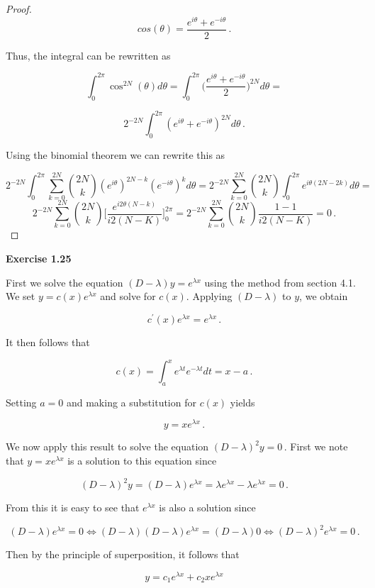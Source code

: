 \documentclass[a4paper]{article}
\numberwithin{equation}{section}
\begin{document}
\begin{description}
\begin{proof}
$$cos(\theta) = \frac{e^{i\theta} + e^{-i\theta}}{2}\,.$$

Thus, the integral can be rewritten as

$$\int_0^{2\pi} \cos^{2N}(\theta)d\theta = \int_0^{2\pi} \Big(\frac{e^{i\theta} + e^{-i\theta}}{2}\Big)^{2N}d\theta = $$

$$2^{-2N} \int_0^{2\pi} (e^{i\theta} + e^{-i\theta})^{2N}d\theta\,.$$

Using the binomial theorem we can rewrite this as

$$2^{-2N} \int_0^{2\pi} \sum_{k=0}^{2N} {2N \choose k} (e^{i\theta})^{2N-k}(e^{-i\theta})^k d\theta = 2^{-2N} \sum_{k=0}^{2N}{2N \choose k} \int_0^{2\pi}  e^{i\theta(2N-2k)} d\theta = $$
$$2^{-2N} \sum_{k=0}^{2N}{2N \choose k} \Big[\frac{e^{i2\theta(N-k)}}{i2(N-K)}\Big]_0^{2\pi} = 2^{-2N} \sum_{k=0}^{2N}{2N \choose k} \frac{1-1}{i2(N-K)} = 0\,.$$

\end{proof}

\item \textbf{Exercise 1.25}

\item First we solve the equation $(D-\lambda)y = e^{\lambda x}$ using the method from section 4.1. We set $y = c(x)e^{\lambda x}$ and solve 
for $c(x)$. Applying $(D-\lambda)$ to $y$, we obtain

$$c^{\prime}(x)e^{\lambda x} = e^{\lambda x}\,.$$

It then follows that

$$c(x) = \int_{a}^{x}e^{\lambda t}e^{-\lambda t}dt = x - a\,.$$

Setting $a = 0$ and making a substitution for $c(x)$ yields

$$y = xe^{\lambda x}\,.$$

We now apply this result to solve the equation $(D-\lambda)^2y = 0\,.$ First we note that $y = xe^{\lambda x}$ is a solution to this equation since 

$$(D-\lambda)^2y = (D - \lambda)e^{\lambda x} = \lambda e^{\lambda x} - \lambda e^{\lambda x} =  0\,.$$

From this it is easy to see that $e^{\lambda x}$ is also a solution since

$$(D - \lambda)e^{\lambda x} = 0 \Leftrightarrow (D-\lambda)(D - \lambda)e^{\lambda x} = (D - \lambda)0 \Leftrightarrow (D - \lambda)^2 e^{\lambda x} = 0\,.$$

Then by the principle of superposition, it follows that 

$$y = c_1e^{\lambda x} + c_2xe^{\lambda x}$$


\end{description}
\end{document}
